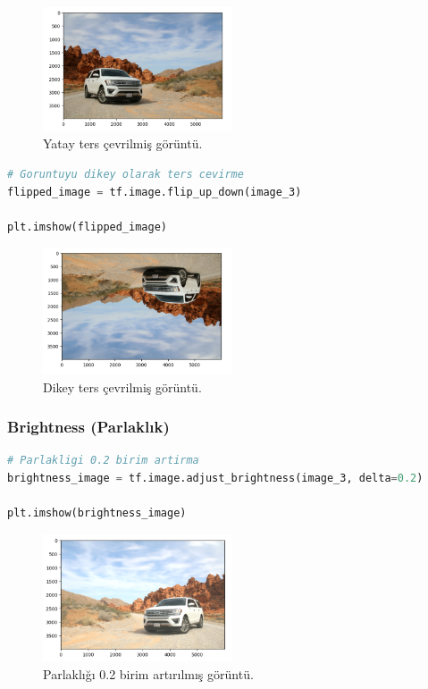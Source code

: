 \newpage

\begin{figure}[h]
    \centering
    \includegraphics[width=0.5\textwidth]{images/image_aug_04.png}
    \caption{Yatay ters çevrilmiş görüntü.}
    \label{fig:enter-label}
\end{figure}

\begin{lstlisting}[language=Python]
# Goruntuyu dikey olarak ters cevirme
flipped_image = tf.image.flip_up_down(image_3)

plt.imshow(flipped_image)
\end{lstlisting}

\begin{figure}[h]
    \centering
    \includegraphics[width=0.5\textwidth]{images/image_aug_05.png}
    \caption{Dikey ters çevrilmiş görüntü.}
    \label{fig:enter-label}
\end{figure}

\subsubsection{Brightness (Parlaklık)}

\begin{lstlisting}[language=Python]
# Parlakligi 0.2 birim artirma
brightness_image = tf.image.adjust_brightness(image_3, delta=0.2)

plt.imshow(brightness_image)
\end{lstlisting}

\newpage

\begin{figure}[h]
    \centering
    \includegraphics[width=0.5\textwidth]{images/image_aug_06.png}
    \caption{Parlaklığı 0.2 birim artırılmış görüntü.}
    \label{fig:enter-label}
\end{figure}

